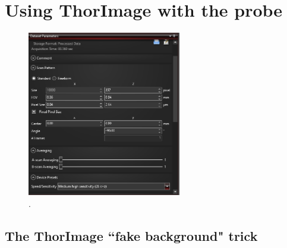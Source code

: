 \documentclass{article}
\begin{document}
\section{Using ThorImage with the probe}

\par{}


\begin{figure}[!h]
	\centering
	\includegraphics[width=0.6\textwidth]{Data for Probe Writeup/ThorImage settings for BScan.png}
	\caption{.}
\end{figure}


\subsection{The ThorImage ``fake background" trick}

\par{}
\end{document}
